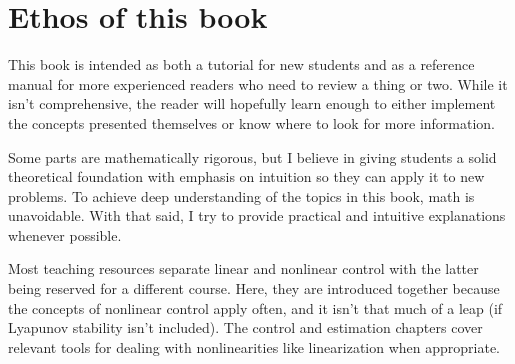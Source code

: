 \section{Ethos of this book}

This book is intended as both a tutorial for new students and as a reference
manual for more experienced readers who need to review a thing or two. While it
isn't comprehensive, the reader will hopefully learn enough to either implement
the concepts presented themselves or know where to look for more information.

Some parts are mathematically rigorous, but I believe in giving students a solid
theoretical foundation with emphasis on intuition so they can apply it to new
problems. To achieve deep understanding of the topics in this book, math is
unavoidable. With that said, I try to provide practical and intuitive
explanations whenever possible.

Most teaching resources separate linear and nonlinear control with the latter
being reserved for a different course. Here, they are introduced together
because the concepts of nonlinear control apply often, and it isn't that much of
a leap (if Lyapunov stability isn't included). The control and estimation
chapters cover relevant tools for dealing with nonlinearities like linearization
when appropriate.
